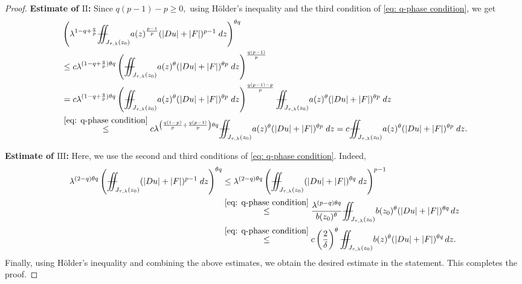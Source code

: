 \documentclass[11pt,oneside, english,reqno,twoside a4paper]{amsart}
\theoremstyle{definition}
\numberwithin{theorem}{section}
\numberwithin{equation}{section}
\newcommand{\iintss}{{\int\hspace{-0.28cm}\int}}
\newcommand{ \miints }{{\iintss\hspace{-0.56cm} -\hspace{-0.15cm}-}}
\newcommand{\miint}[1]{{\miints_{\hspace{-0.13cm}#1}}}
\begin{document}
\begin{proof}
\noindent\textbf{Estimate of $\mathrm{II}$:} Since $q(p-1)-p\geq 0,$ using H\"{o}lder's inequality and the third condition of \eqref{eq: q-phase condition}, we get
\begin{align*}
&\left(\lambda^{1-q+\frac{q}{p}}\miint{J_{\tau,\lambda}(z_0)} a(z)^{\frac{p-1}{p}}(|Du|+|F|)^{p-1}\; dz \right)^{\theta q}\\
&\leq c\lambda^{(1-q+\frac{q}{p})\theta q}\left(\miint{J_{\tau,\lambda}(z_0)} a(z)^\theta(|Du|+|F|)^{\theta p}\; dz \right)^{\frac{q(p-1)}{p}}\\
&=c\lambda^{(1-q+\frac{q}{p})\theta q}\left(\miint{J_{\tau,\lambda}(z_0)} a(z)^\theta(|Du|+|F|)^{\theta p}\; dz \right)^{\frac{q(p-1)-p}{p}} \miint{J_{\tau,\lambda}(z_0)} a(z)^\theta(|Du|+|F|)^{\theta p}\; dz \\
&\overset{\eqref{eq: q-phase condition}}{\leq} c \lambda^{\left(\frac{q(1-p)}{p}+\frac{q(p-1)}{p}\right)\theta q} \miint{J_{\tau,\lambda}(z_0)} a(z)^\theta(|Du|+|F|)^{\theta p}\; dz=c\miint{J_{\tau,\lambda}(z_0)} a(z)^\theta(|Du|+|F|)^{\theta p}\; dz.
\end{align*}

\noindent\textbf{Estimate of $\mathrm{III}$:} Here, we use the second and third conditions of \eqref{eq: q-phase condition}. Indeed, 
\begin{align*}
\lambda^{(2-q)\theta q}\left(\miint{J_{\tau,\lambda}(z_0)} (|Du|+|F|)^{p-1}\; dz \right)^{\theta q}&\leq \lambda^{(2-q)\theta q}\left(\miint{J_{\tau,\lambda}(z_0)} (|Du|+|F|)^{\theta q}\; dz \right)^{p-1}\\
&\overset{\eqref{eq: q-phase condition}}{\leq}\frac{\lambda^{(p-q)\theta q}}{b(z_0)^{\theta}} \miint{J_{\tau, \lambda}(z_0)}b(z_0)^{\theta}(|Du|+|F|)^{\theta q}\, dz\\
&\overset{\eqref{eq: q-phase condition}}{\leq} c\left(\frac{2}{\delta}\right)^\theta \miint{J_{\tau, \lambda}(z_0)}b(z)^{\theta}(|Du|+|F|)^{\theta q}\, dz.
\end{align*}
Finally, using H\"{o}lder's inequality and combining the above estimates, we obtain the desired estimate in the statement. This completes the proof.
\end{proof}
\end{document}
